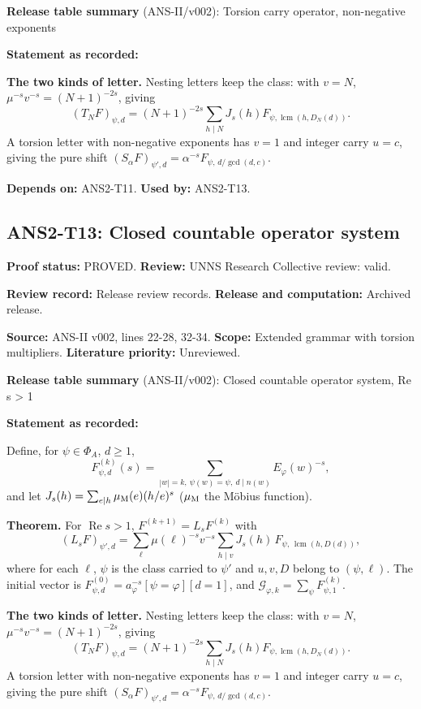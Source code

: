 \documentclass[
  11pt,
]{article}
\begin{document}
\textbf{Release table summary} (ANS-II/v002): Torsion carry operator,
non-negative exponents

\textbf{Statement as recorded:}

\textbf{The two kinds of letter.} Nesting letters keep the class: with
\(v=N\), \(\mu^{-s}v^{-s}=(N+1)^{-2s}\), giving
\[(T_NF)_{\psi,d}=(N+1)^{-2s}\sum_{h\mid N}J_s(h)F_{\psi,\operatorname{lcm}(h,D_N(d))}.\]
A torsion letter with non-negative exponents has \(v=1\) and integer
carry \(u=c\), giving the pure shift
\((S_\alpha F)_{\psi',d}=\alpha^{-s}F_{\psi,\,d/\gcd(d,c)}\).

\textbf{Depends on:} ANS2-T11. \textbf{Used by:} ANS2-T13.

\hypertarget{ans2-t13-closed-countable-operator-system}{%
\subsection{ANS2-T13: Closed countable operator
system}\label{ans2-t13-closed-countable-operator-system}}

\textbf{Proof status:} PROVED. \textbf{Review:} UNNS Research Collective
review: valid.

\textbf{Review record:} Release review records. \textbf{Release and
computation:} Archived release.

\textbf{Source:} ANS-II v002, lines 22-28, 32-34. \textbf{Scope:}
Extended grammar with torsion multipliers. \textbf{Literature priority:}
Unreviewed.

\textbf{Release table summary} (ANS-II/v002): Closed countable operator
system, Re s \textgreater{} 1

\textbf{Statement as recorded:}

Define, for \(\psi\in\Phi_A\), \(d\ge1\),
\[F^{(k)}_{\psi,d}(s)=\sum_{|w|=k,\ \psi(w)=\psi,\ d\mid n(w)}E_\varphi(w)^{-s},\]
and let \(J_s(h)=\sum_{e\mid h}\mu_{\rm M}(e)(h/e)^s\) (\(\mu_{\rm M}\)
the Möbius function).

\textbf{Theorem.} For \(\operatorname{Re}s>1\), \(F^{(k+1)}=L_sF^{(k)}\)
with
\[(L_sF)_{\psi',d}=\sum_{\ell}\mu(\ell)^{-s}v^{-s}\sum_{h\mid v}J_s(h)\,F_{\psi,\,\operatorname{lcm}(h,D(d))},\]
where for each \(\ell\), \(\psi\) is the class carried to \(\psi'\) and
\(u,v,D\) belong to \((\psi,\ell)\). The initial vector is
\(F^{(0)}_{\psi,d}=a_\varphi^{-s}[\psi=\varphi][d=1]\), and
\(\mathcal G_{\varphi,k}=\sum_\psi F^{(k)}_{\psi,1}\).

\textbf{The two kinds of letter.} Nesting letters keep the class: with
\(v=N\), \(\mu^{-s}v^{-s}=(N+1)^{-2s}\), giving
\[(T_NF)_{\psi,d}=(N+1)^{-2s}\sum_{h\mid N}J_s(h)F_{\psi,\operatorname{lcm}(h,D_N(d))}.\]
A torsion letter with non-negative exponents has \(v=1\) and integer
carry \(u=c\), giving the pure shift
\((S_\alpha F)_{\psi',d}=\alpha^{-s}F_{\psi,\,d/\gcd(d,c)}\).
\end{document}
